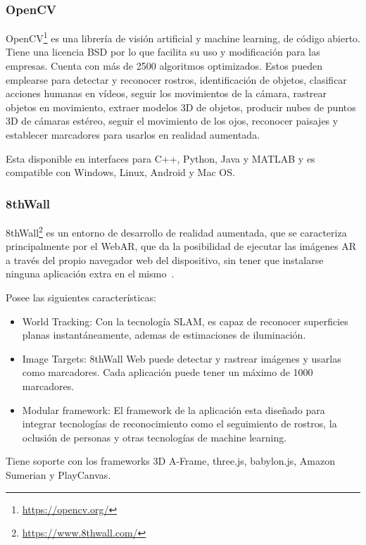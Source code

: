 \subsubsection{OpenCV}

OpenCV\footnote{\url{https://opencv.org/}} es una librería de visión artificial y machine learning, de código abierto. Tiene una licencia BSD por lo que facilita su uso y modificación para las empresas. Cuenta con más de 2500 algoritmos optimizados. Estos pueden emplearse para detectar y reconocer rostros, identificación de objetos, clasificar acciones humanas en vídeos, seguir los movimientos de la cámara, rastrear objetos en movimiento, extraer modelos 3D de objetos, producir nubes de puntos 3D de cámaras estéreo, seguir el movimiento de los ojos, reconocer paisajes y establecer marcadores para usarlos en realidad aumentada.

Esta disponible en interfaces para C++, Python, Java y MATLAB y es compatible con Windows, Linux, Android y Mac OS.


\subsubsection{8thWall}

8thWall\footnote{\url{https://www.8thwall.com/}}
es un entorno de desarrollo de realidad aumentada, que se caracteriza principalmente por el WebAR, que da la posibilidad de ejecutar las imágenes AR a través del propio navegador web del dispositivo, sin tener que instalarse ninguna aplicación extra en el mismo~\cite{8thwall_products}.

Posee las siguientes características:

\begin{itemize}
	\item World Tracking: Con la tecnología SLAM, es capaz de reconocer superficies planas instantáneamente, ademas de estimaciones de iluminación.
	\item Image Targets: 8thWall Web puede detectar y rastrear imágenes y usarlas como marcadores. Cada aplicación puede tener un máximo de 1000 marcadores.
	\item Modular framework: El framework de la aplicación esta diseñado para integrar tecnologías de reconocimiento como el seguimiento de rostros, la oclusión de personas y otras tecnologías de machine learning.
\end{itemize}


Tiene soporte con los frameworks 3D A-Frame, three.js, babylon.js, Amazon Sumerian y PlayCanvas.

